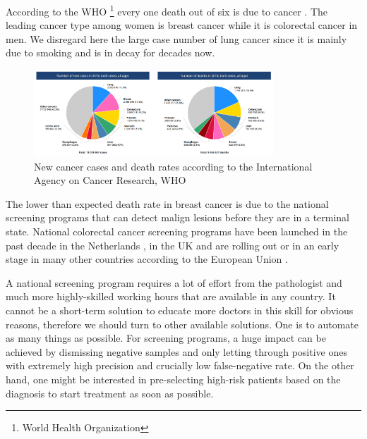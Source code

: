 \documentclass[a4paper,12pt]{article}
\begin{document}
\vspace{4mm}

\par According to the WHO \footnote{World Health Organization} every one death out of six is due to cancer \cite{whoCANCER}. The leading cancer type among women is breast cancer while it is colorectal cancer in men. We disregard here the large case number of lung cancer since it is mainly due to smoking and is in decay for decades now.

\vspace{4mm}

\begin{figure}[H]
    \centering
    \includegraphics[width=0.8\textwidth]{all_cancer_pie_charts.png}
    \caption{New cancer cases and death rates according to the International Agency on Cancer Research,  WHO}
    \label{fig:cancer_pie_chart}
\end{figure}

\vspace{4mm}

\par The lower than expected death rate in breast cancer is due to the national screening programs that can detect malign lesions before they are in a terminal state. National colorectal cancer screening programs have been launched in the past decade in the Netherlands \cite{rivm_2014}, in the UK \cite{gov.uk_2015} and are rolling out or in an early stage in many other countries according to the European Union \cite{euReportOnCancer}.

\vspace{4mm}

\par A national screening program requires a lot of effort from the pathologist and much more highly-skilled working hours that are available in any country. It cannot be a short-term solution to educate more doctors in this skill for obvious reasons, therefore we should turn to other available solutions. One is to automate as many things as possible. For screening programs, a huge impact can be achieved by dismissing negative samples and only letting through positive ones with extremely high precision and crucially low false-negative rate. On the other hand, one might be interested in pre-selecting high-risk patients based on the diagnosis to start treatment as soon as possible.
\end{document}
